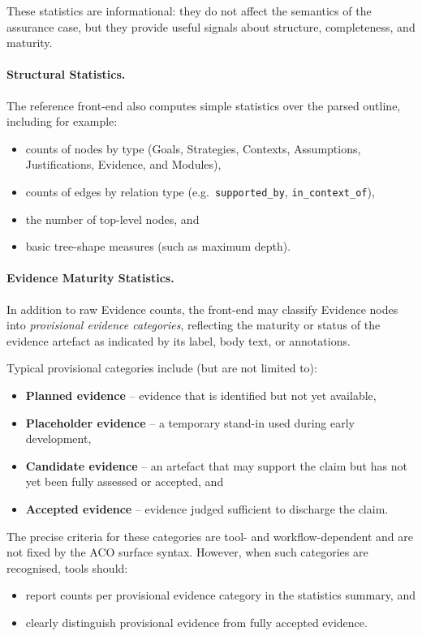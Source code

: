 \documentclass[11pt]{article}
\begin{document}
These statistics are informational: they do not affect the semantics of the
assurance case, but they provide useful signals about structure, completeness,
and maturity.

\paragraph{Structural Statistics.}
The reference front-end also computes simple statistics over the parsed outline,
including for example:
\begin{itemize}[leftmargin=2em]
  \item counts of nodes by type (Goals, Strategies, Contexts, Assumptions,
        Justifications, Evidence, and Modules),
  \item counts of edges by relation type (e.g.\ \texttt{supported\_by},
        \texttt{in\_context\_of}),
  \item the number of top-level nodes, and
  \item basic tree-shape measures (such as maximum depth).
\end{itemize}

\paragraph{Evidence Maturity Statistics.}
In addition to raw Evidence counts, the front-end may classify Evidence nodes into
\emph{provisional evidence categories}, reflecting the maturity or status of the
evidence artefact as indicated by its label, body text, or annotations.

Typical provisional categories include (but are not limited to):
\begin{itemize}[leftmargin=2em]
  \item \textbf{Planned evidence} -- evidence that is identified but not yet available,
  \item \textbf{Placeholder evidence} -- a temporary stand-in used during early development,
  \item \textbf{Candidate evidence} -- an artefact that may support the claim but has not
        yet been fully assessed or accepted, and
  \item \textbf{Accepted evidence} -- evidence judged sufficient to discharge the claim.
\end{itemize}

The precise criteria for these categories are tool- and workflow-dependent and are
not fixed by the ACO surface syntax. However, when such categories are recognised,
tools should:
\begin{itemize}[leftmargin=2em]
  \item report counts per provisional evidence category in the statistics summary, and
  \item clearly distinguish provisional evidence from fully accepted evidence.
\end{itemize}
\end{document}
